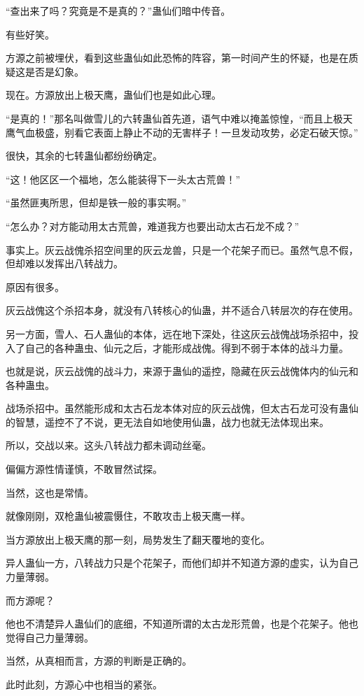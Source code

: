 \begin{this_body}
“查出来了吗？究竟是不是真的？”蛊仙们暗中传音。

有些好笑。

方源之前被埋伏，看到这些蛊仙如此恐怖的阵容，第一时间产生的怀疑，也是在质疑这是否是幻象。

现在。方源放出上极天鹰，蛊仙们也是如此心理。

“是真的！”那名叫做雪儿的六转蛊仙首先道，语气中难以掩盖惊惶，“而且上极天鹰气血极盛，别看它表面上静止不动的无害样子！一旦发动攻势，必定石破天惊。”

很快，其余的七转蛊仙都纷纷确定。

“这！他区区一个福地，怎么能装得下一头太古荒兽！”

“虽然匪夷所思，但却是铁一般的事实啊。”

“怎么办？对方能动用太古荒兽，难道我方也要出动太古石龙不成？”

事实上。灰云战傀杀招空间里的灰云龙兽，只是一个花架子而已。虽然气息不假，但却难以发挥出八转战力。

原因有很多。

灰云战傀这个杀招本身，就没有八转核心的仙蛊，并不适合八转层次的存在使用。

另一方面，雪人、石人蛊仙的本体，远在地下深处，往这灰云战傀战场杀招中，投入了自己的各种蛊虫、仙元之后，才能形成战傀。得到不弱于本体的战斗力量。

也就是说，灰云战傀的战斗力，来源于蛊仙的遥控，隐藏在灰云战傀体内的仙元和各种蛊虫。

战场杀招中。虽然能形成和太古石龙本体对应的灰云战傀，但太古石龙可没有蛊仙的智慧，遥控不了不说，更无法自如地使用仙蛊，战力也就无法体现出来。

所以，交战以来。这头八转战力都未调动丝毫。

偏偏方源性情谨慎，不敢冒然试探。

当然，这也是常情。

就像刚刚，双枪蛊仙被震慑住，不敢攻击上极天鹰一样。

当方源放出上极天鹰的那一刻，局势发生了翻天覆地的变化。

异人蛊仙一方，八转战力只是个花架子，而他们却并不知道方源的虚实，认为自己力量薄弱。

而方源呢？

他也不清楚异人蛊仙们的底细，不知道所谓的太古龙形荒兽，也是个花架子。他也觉得自己力量薄弱。

当然，从真相而言，方源的判断是正确的。

此时此刻，方源心中也相当的紧张。


\end{this_body}
